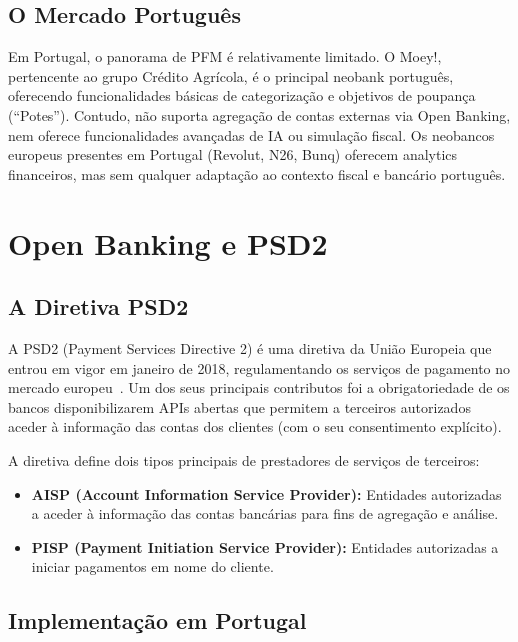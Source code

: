 \subsection{O Mercado Português}

Em Portugal, o panorama de \ac{PFM} é relativamente limitado. O Moey!, pertencente ao grupo Crédito Agrícola, é o principal neobank português, oferecendo funcionalidades básicas de categorização e objetivos de poupança (``Potes''). Contudo, não suporta agregação de contas externas via Open Banking, nem oferece funcionalidades avançadas de \ac{IA} ou simulação fiscal. Os neobancos europeus presentes em Portugal (Revolut, N26, Bunq) oferecem analytics financeiros, mas sem qualquer adaptação ao contexto fiscal e bancário português.


\section{Open Banking e PSD2}
\label{sec:ea-openbanking}

\subsection{A Diretiva PSD2}

A \ac{PSD2} (Payment Services Directive 2) é uma diretiva da União Europeia que entrou em vigor em janeiro de 2018, regulamentando os serviços de pagamento no mercado europeu~\cite{psd2directive}. Um dos seus principais contributos foi a obrigatoriedade de os bancos disponibilizarem \ac{API}s abertas que permitem a terceiros autorizados aceder à informação das contas dos clientes (com o seu consentimento explícito).

A diretiva define dois tipos principais de prestadores de serviços de terceiros:
\begin{itemize}
    \item \textbf{\ac{AISP} (Account Information Service Provider):} Entidades autorizadas a aceder à informação das contas bancárias para fins de agregação e análise.
    \item \textbf{PISP (Payment Initiation Service Provider):} Entidades autorizadas a iniciar pagamentos em nome do cliente.
\end{itemize}

\subsection{Implementação em Portugal}

